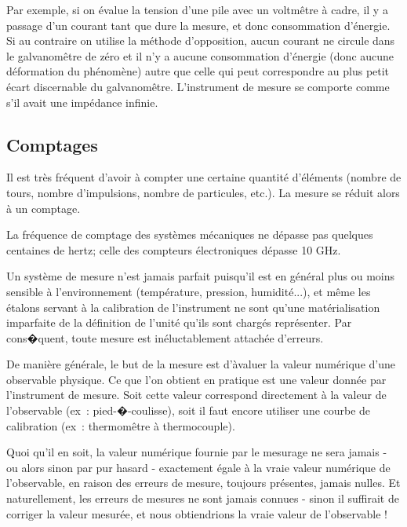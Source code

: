 Par exemple, si on évalue la tension d'une pile avec un voltmêtre à cadre, il y a passage d'un courant tant que dure la mesure, et donc consommation d'énergie. Si au contraire on utilise la méthode d'opposition, aucun courant ne circule dans le galvanomêtre de zéro et il n'y a aucune consommation d'énergie (donc aucune déformation du phénomène) autre que celle qui peut correspondre au plus petit écart discernable du galvanomêtre. L'instrument de mesure se comporte comme s'il avait une impédance infinie.

\subsection{Comptages}

Il est très fréquent d'avoir à compter une certaine quantité d'éléments (nombre de tours, nombre d'impulsions, nombre de particules, etc.). La mesure se réduit alors à un comptage.

La fréquence de comptage des systèmes mécaniques ne dépasse pas quelques centaines de hertz; celle des compteurs électroniques dépasse 10 GHz.

Un système de mesure n'est jamais parfait puisqu'il est en général plus ou moins sensible à l'environnement (température, pression, humidité...), et même les étalons servant à la calibration de l'instrument ne sont qu'une matérialisation imparfaite de la définition de l'unité qu'ils sont chargés représenter. Par cons�quent, toute mesure est inéluctablement attachée d'erreurs.

De manière générale, le but de la mesure est d'àvaluer la valeur numérique d'une observable physique. Ce que l'on obtient en pratique est une valeur donnée par l'instrument de mesure. Soit cette valeur correspond directement à la valeur de l'observable (ex~: pied-�-coulisse), soit il faut encore utiliser une courbe de calibration (ex~: thermomêtre à thermocouple).

Quoi qu'il en soit, la valeur numérique fournie par le mesurage ne sera jamais - ou alors sinon par pur hasard - exactement égale à la vraie valeur numérique de l'observable, en raison des erreurs de mesure, toujours présentes, jamais nulles. Et naturellement, les erreurs de mesures ne sont jamais connues - sinon il suffirait de corriger la valeur mesurée, et nous obtiendrions la vraie valeur de l'observable !

